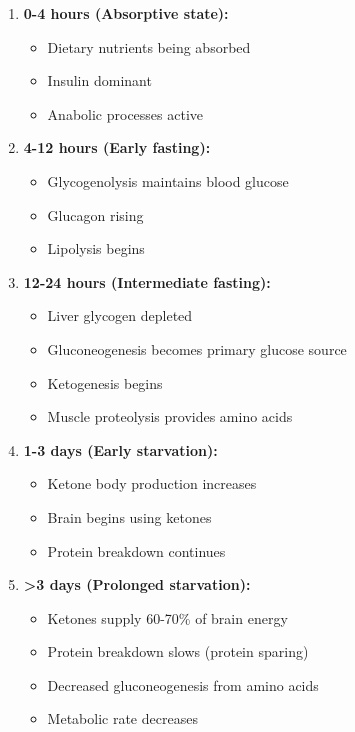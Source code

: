 \begin{enumerate}
    \item \textbf{0-4 hours (Absorptive state):}
    \begin{itemize}
        \item Dietary nutrients being absorbed
        \item Insulin dominant
        \item Anabolic processes active
    \end{itemize}
    
    \item \textbf{4-12 hours (Early fasting):}
    \begin{itemize}
        \item Glycogenolysis maintains blood glucose
        \item Glucagon rising
        \item Lipolysis begins
    \end{itemize}
    
    \item \textbf{12-24 hours (Intermediate fasting):}
    \begin{itemize}
        \item Liver glycogen depleted
        \item Gluconeogenesis becomes primary glucose source
        \item Ketogenesis begins
        \item Muscle proteolysis provides amino acids
    \end{itemize}
    
    \item \textbf{1-3 days (Early starvation):}
    \begin{itemize}
        \item Ketone body production increases
        \item Brain begins using ketones
        \item Protein breakdown continues
    \end{itemize}
    
    \item \textbf{>3 days (Prolonged starvation):}
    \begin{itemize}
        \item Ketones supply 60-70\% of brain energy
        \item Protein breakdown slows (protein sparing)
        \item Decreased gluconeogenesis from amino acids
        \item Metabolic rate decreases
    \end{itemize}
\end{enumerate}

